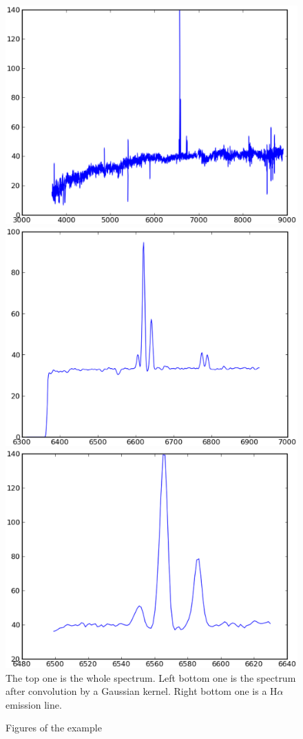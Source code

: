 \begin{figure}[!hb]
\begin{center}
\caption{Figures of the example}
\label{fig}
\includegraphics[width=1.\textwidth, height=.2\textheight]{part9/Song_P65/spectra}\\

\includegraphics[width=.46\textwidth]{part9/Song_P65/part}
\includegraphics[width=.46\textwidth]{part9/Song_P65/halpha}\\
The top one is the whole spectrum. Left bottom one is the spectrum after convolution by a Gaussian kernel. Right bottom one is a H$\alpha$ emission line.
\end{center}
\end{figure}
